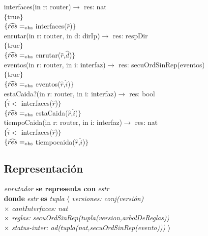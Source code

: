 interfaces(in r: router)$\longrightarrow$ res: nat\\
$\{$true$\}$\\
$\{\widehat{res} =_{\mathrm{obs}}$ interfaces($\widehat{r}$)$\}$\\

enrutar(in r: router, in d: dirIp)$\longrightarrow$ res: respDir\\
$\{$true$\}$\\
$\{\widehat{res} =_{\mathrm{obs}}$ enrutar($\widehat{r}$,$\widehat{d}$)$\}$\\

eventos(in r: router, in i: interfaz)$\longrightarrow$ res: secuOrdSinRep(eventos)\\
$\{$true$\}$\\
$\{\widehat{res} =_{\mathrm{obs}}$ eventos($\widehat{r}$,$\widehat{i}$)$\}$\\

estaCaida?(in r: router, in i: interfaz)$\longrightarrow$ res: bool\\
$\{\widehat{i} <$ interfaces($\widehat{r}$)$\}$\\
$\{\widehat{res} =_{\mathrm{obs}}$ estaCaida($\widehat{r}$,$\widehat{i}$)$\}$\\

tiempoCaida(in r: router, in i: interfaz)$\longrightarrow$ res: nat\\
$\{\widehat{i} <$ interfaces($\widehat{r}$)$\}$\\
$\{\widehat{res} =_{\mathrm{obs}}$ tiempocaida($\widehat{r}$,$\widehat{i}$)$\}$\\


\subsection*{Representaci\'on}
\textit{enrutador} \textbf{se representa con} \textit{estr}\\
\textbf{donde} \textit{estr} \textbf{es} \textit{tupla $\langle$ versiones: conj(versi\'on)\\
\hspace*{3.5cm} $\times$  cantInterfaces: nat\\
\hspace*{3.5cm} $\times$  reglas: secuOrdSinRep(tupla(version,arbolDeReglas))\\ %
\hspace*{3.5cm} $\times$  status-inter: ad(tupla(nat,secuOrdSinRep(evento))) $\rangle$}


